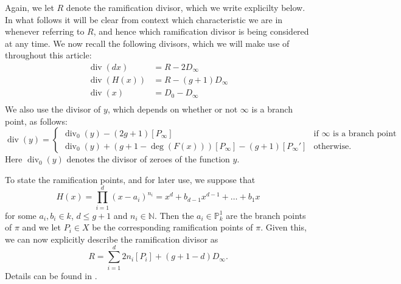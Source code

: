 \documentclass[draft, 11pt]{article} %
\theoremstyle{plain}
\theoremstyle{remark}
\DeclareMathOperator{\di}{div}
\begin{document}
Again, we let $R$ denote the ramification divisor, which we write explicilty below.
In what follows it will be clear from context which characteristic we are in whenever referring to $R$, and hence which ramification divisor is being considered at any time.
We now recall the following divisors, which we will make use of throughout this article:
\begin{align}
\di (dx) & = R - 2D_\infty \label{divdxp=2}\\
\di (H(x)) & = R - (g+1)D_\infty \label{divhp=2}\\
\di (x) & = D_0 - D_\infty \label{divxp=2}\\
\end{align}
We also use the divisor of $y$, which depends on whether or not $\infty$ is a branch point, as follows:
\begin{equation}\label{divyp=2}
\di(y) = \begin{cases}
 \di_0(y) -(2g+1)[P_\infty] & \text{if $\infty$ is a branch point} \\
 \di_0(y) +(g+1-\deg(F(x)))[P_\infty] - (g+1)[P_\infty'] & \text{otherwise.}
\end{cases}
\end{equation}
Here $\di_0(y)$ denotes the divisor of zeroes of the function $y$.


To state the ramification points, and for later use, we suppose that 
\begin{equation}\label{hcoefficients}
H(x) = \prod_{i=1}^d (x-a_i)^{n_i} = x^d + b_{d-1}x^{d-1} + \ldots + b_1x
\end{equation}
for some $a_i, b_i \in  k$, $d \leq g+1$ and $n_i \in \mathbb N$.
Then the $a_i \in \mathbb P_k^1$ are the branch points of $\pi$ and we let $P_i \in X$ be the corresponding ramification points of $\pi$.
Given this, we can now explicitly describe the ramification divisor as
\[
R = \sum_{i=1}^d 2n_i[P_i] + (g+1-d)D_\infty.
\]
Details can be found in \cite[\S 6]{faithfulaction}.
\end{document}
